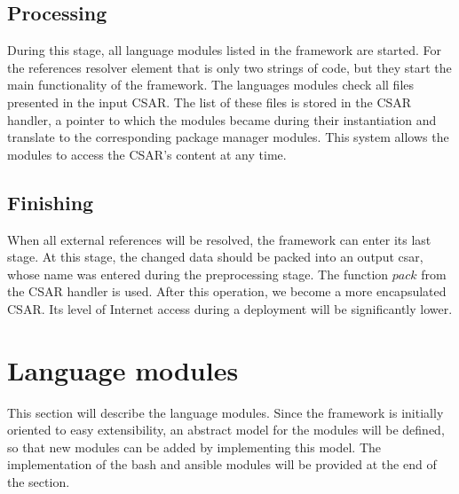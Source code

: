 \subsection*{Processing}
During this stage, all language modules listed in the framework are started.
For the references resolver element that is only two strings of code, but they start the main functionality of the framework.
The languages modules check all files presented in the input CSAR. 
The list of these files is stored in the CSAR handler, a pointer to which the modules became during their instantiation and translate to the corresponding package manager modules.
This system allows the modules to access the CSAR's content at any time.


\subsection*{Finishing}
When all external references will be resolved, the framework can enter its last stage.
At this stage, the changed data should be packed into an output \gls{csar}, whose name was entered during the preprocessing stage.
The function $pack$ from the CSAR handler is used. 
After this operation, we become a more encapsulated CSAR.
Its level of Internet access during a deployment will be significantly lower.

\section{Language modules} 
This section will describe the language modules. %
Since the framework is initially oriented to easy extensibility, an abstract model for the modules will be defined, so that new modules can be added by implementing this model.
The implementation of the bash and ansible modules will be provided at the end of the section.

